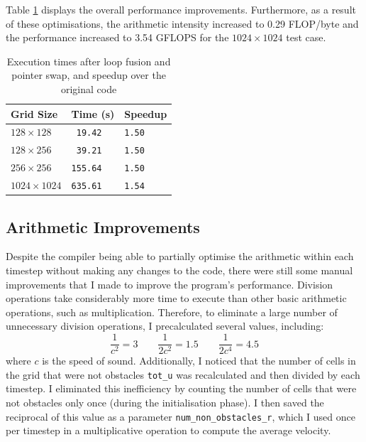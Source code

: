 \documentclass[twocolumn, a4paper]{article}
\begin{document}
Table \ref{tab:loop_fusion_pointer_swap} displays the overall performance improvements.
Furthermore, as a result of these optimisations, the arithmetic intensity increased to 0.29 FLOP/byte and the performance increased to 3.54 GFLOPS for the $1024 \times 1024$ test case.

\begin{table}[htbp]
  \begin{center}
  \caption{Execution times after loop fusion and pointer swap, and speedup over the original code}\label{tab:loop_fusion_pointer_swap}
  \begin{tabular}{l | l l} 
      \hline\hline
      Grid Size&Time (s)&Speedup\\
      \hline
      $128 \times 128$&\texttt{ 19.42}&\texttt{1.50}\\
      $128 \times 256$&\texttt{ 39.21}&\texttt{1.50}\\
      $256 \times 256$&\texttt{155.64}&\texttt{1.50}\\
      $1024 \times 1024$&\texttt{635.61}&\texttt{1.54}\\
      \hline
    \end{tabular}
  \end{center}
\end{table}

\subsection{Arithmetic Improvements}

Despite the compiler being able to partially optimise the arithmetic within each timestep without making any changes to the code, there were still some manual improvements that I made to improve the program's performance.
Division operations take considerably more time to execute than other basic arithmetic operations, such as multiplication.
Therefore, to eliminate a large number of unnecessary division operations, I precalculated several values, including:
\[
    \frac{1}{c^2} = 3\qquad
    \frac{1}{2c^2} = 1.5\qquad
    \frac{1}{2c^4} = 4.5
\]
where $c$ is the speed of sound.
Additionally, I noticed that the number of cells in the grid that were not obstacles \texttt{tot\_u} was recalculated and then divided by each timestep.
I eliminated this inefficiency by counting the number of cells that were not obstacles only once (during the initialisation phase).
I then saved the reciprocal of this value as a parameter \texttt{num\_non\_obstacles\_r}, which I used once per timestep in a multiplicative operation to compute the average velocity.
\end{document}
